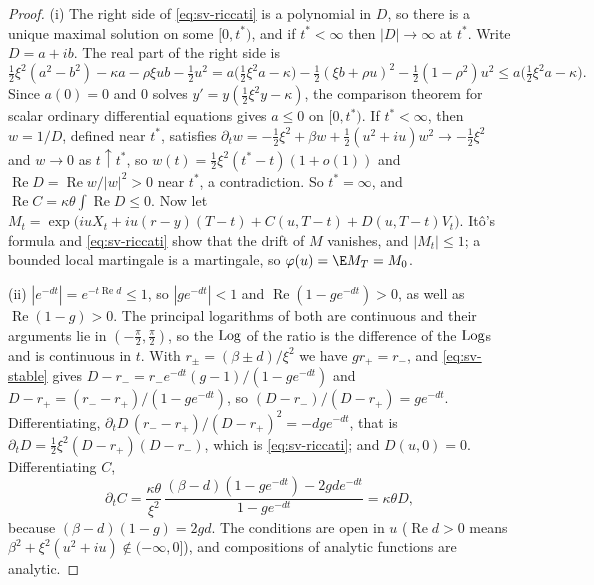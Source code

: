 \begin{proof}
(i) The right side of \eqref{eq:sv-riccati} is a polynomial in $D$, so there is a unique maximal solution on
some $[0,t^*)$, and if $t^*<\infty$ then $|D|\to\infty$ at $t^*$. Write $D=a+ib$. The real part of the right
side is
\[
  \tfrac12\xi^2(a^2-b^2)-\kappa a-\rho\xi ub-\tfrac12u^2
  =a\big(\tfrac12\xi^2a-\kappa\big)-\tfrac12(\xi b+\rho u)^2-\tfrac12(1-\rho^2)u^2\le a\big(\tfrac12\xi^2a-\kappa\big).
\]
Since $a(0)=0$ and $0$ solves $y'=y(\frac12\xi^2y-\kappa)$, the comparison theorem for scalar ordinary
differential equations gives $a\le0$ on $[0,t^*)$. If $t^*<\infty$, then $w=1/D$, defined near $t^*$, satisfies
$\partial_tw=-\frac12\xi^2+\beta w+\frac12(u^2+iu)w^2\to-\frac12\xi^2$ and $w\to0$ as $t\uparrow t^*$, so
$w(t)=\frac12\xi^2(t^*-t)(1+o(1))$ and $\operatorname{Re}D=\operatorname{Re}w/|w|^2>0$ near $t^*$, a contradiction. So
$t^*=\infty$, and $\operatorname{Re}C=\kappa\theta\int\operatorname{Re}D\le0$. Now let
$M_t=\exp\big(iuX_t+iu(r-y)(T-t)+C(u,T-t)+D(u,T-t)V_t\big)$. It\^o's formula and \eqref{eq:sv-riccati} show that
the drift of $M$ vanishes, and $|M_t|\le1$; a bounded local martingale is a martingale, so
$\varphi(u)=\E M_T=M_0$.

(ii) $|e^{-dt}|=e^{-t\operatorname{Re}d}\le1$, so $|ge^{-dt}|<1$ and $\operatorname{Re}(1-ge^{-dt})>0$, as well as
$\operatorname{Re}(1-g)>0$. The principal logarithms of both are continuous and their arguments lie in
$(-\frac\pi2,\frac\pi2)$, so the $\operatorname{Log}$ of the ratio is the difference of the $\operatorname{Log}$s and is continuous in $t$.
With $r_\pm=(\beta\pm d)/\xi^2$ we have $gr_+=r_-$, and \eqref{eq:sv-stable} gives
$D-r_-=r_-e^{-dt}(g-1)/(1-ge^{-dt})$ and $D-r_+=(r_--r_+)/(1-ge^{-dt})$, so
$(D-r_-)/(D-r_+)=ge^{-dt}$. Differentiating, $\partial_tD\,(r_--r_+)/(D-r_+)^2=-dge^{-dt}$, that is
$\partial_tD=\frac12\xi^2(D-r_+)(D-r_-)$, which is \eqref{eq:sv-riccati}; and $D(u,0)=0$. Differentiating $C$,
\[
  \partial_tC=\frac{\kappa\theta}{\xi^2}\,\frac{(\beta-d)(1-ge^{-dt})-2gde^{-dt}}{1-ge^{-dt}}=\kappa\theta D,
\]
because $(\beta-d)(1-g)=2gd$. The conditions are open in $u$ ($\operatorname{Re}d>0$ means
$\beta^2+\xi^2(u^2+iu)\notin(-\infty,0]$), and compositions of analytic functions are analytic.


\end{proof}
